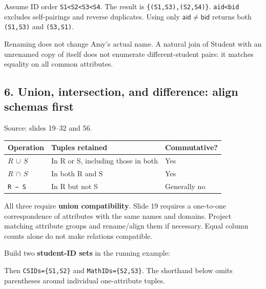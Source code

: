 Assume ID order \texttt{S1\textless{}S2\textless{}S3\textless{}S4}. The result is \texttt{\{(S1,S3),(S2,S4)\}}. \texttt{aid\textless{}bid} excludes self-pairings and reverse duplicates. Using only \(\mathsf{aid}\ne \mathsf{bid}\) returns both \texttt{(\allowbreak{}S1,\allowbreak{}S3)\allowbreak{}} and \texttt{(\allowbreak{}S3,\allowbreak{}S1)\allowbreak{}}.

Renaming does not change Amy's actual name. A natural join of Student with an unrenamed copy of itself does not enumerate different-student pairs: it matches equality on all common attributes.

\subsection{6. Union, intersection, and difference: align schemas first}\label{05_relational_algebra_en-union-intersection-and-difference-align-schemas-first}

Source: slides 19--32 and 56.

\begin{longtable}[]{@{}lll@{}}
\toprule\noalign{}
Operation & Tuples retained & Commutative? \\
\midrule\noalign{}
\endhead
\bottomrule\noalign{}
\endlastfoot
\(R\,\cup \,S\) & In R or S, including those in both & Yes \\
\(R\,\cap \,S\) & In both R and S & Yes \\
\texttt{R\ −\ S} & In R but not S & Generally no \\
\end{longtable}

All three require \textbf{union compatibility}. Slide 19 requires a one-to-one correspondence of attributes with the same names and domains. Project matching attribute groups and rename/align them if necessary. Equal column counts alone do not make relations compatible.

Build two \textbf{student-ID sets} in the running example:


Then \texttt{CSIDs=\{S1,S2\}} and \texttt{MathIDs=\{S2,S3\}}. The shorthand below omits parentheses around individual one-attribute tuples.

